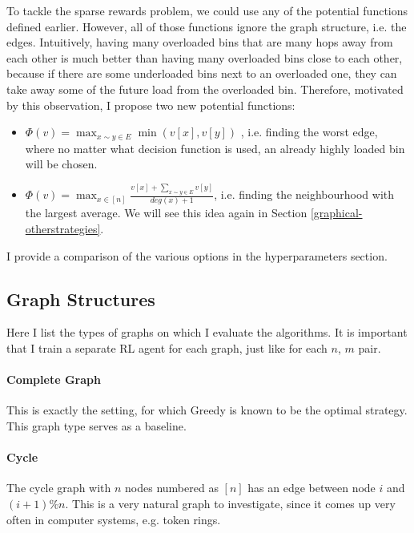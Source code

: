 To tackle the sparse rewards problem, we could use any of the potential functions defined earlier. However, all of those functions ignore the graph structure, i.e. the edges. Intuitively, having many overloaded bins that are many hops away from each other is much better than having many overloaded bins close to each other, because if there are some underloaded bins next to an overloaded one, they can take away some of the future load from the overloaded bin. Therefore, motivated by this observation, I propose two new potential functions:


\begin{itemize}
    \item 
    $\Phi(v)=\max_{x\sim y \in E} \min(v[x], v[y])$ , i.e. finding the worst edge, where no matter what decision function is used, an already highly loaded bin will be chosen.
    \item
    $\Phi(v)=\max_{x \in [n]} \frac{v[x]+\sum_{x\sim y \in E}v[y]}{deg(x)+1}$, i.e. finding the neighbourhood with the largest average. We will see this idea again in Section \ref{graphical-otherstrategies}.
\end{itemize}

I provide a comparison of the various options in the hyperparameters section.


\subsection{Graph Structures}


Here I list the types of graphs on which I evaluate the algorithms. It is important that I train a separate RL agent for each graph, just like for each $n$, $m$ pair.


\paragraph{Complete Graph} This is exactly the \TwoChoice setting, for which Greedy is known to be the optimal strategy. This graph type serves as a baseline.


\paragraph{Cycle} The cycle graph with $n$ nodes numbered as $[n]$ has an edge between node $i$ and $(i+1)\%n$. This is a very natural graph to investigate, since it comes up very often in computer systems, e.g. token rings.


